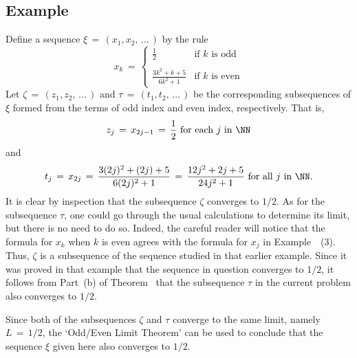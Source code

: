 \V

        \subsection{\small{{\bf Example}}}
        \label{ExampC20.95}

\V

        Define a sequence ${\xi} \,=\, (x_{1},x_{2},\,{\ldots}\,)$ by the rule
        \begin{displaymath}
        x_{k} \,=\, 
        \left\{
        \begin{array}{ll}
        {\displaystyle \frac{1}{2}} & \mbox{if $k$ is odd} \\
                                            &                      \\
        {\displaystyle \frac{3k^{2}+k+5}{6k^{2}+1}}  & \mbox{if $k$ is even}
        \end{array}
                \right.
        \end{displaymath}
    Let ${\zeta} \,=\, (z_{1},z_{2},\,{\ldots}\,)$ and ${\tau} \,=\, (t_{1},t_{2},\,{\ldots}\,)$ be the corresponding subsequences of ${\xi}$ formed from the terms of odd index and even index, respectively.
    That is,
        \begin{displaymath}
        z_{j} \,=\, x_{2j-1} \,=\, \frac{1}{2} \mbox{ for each $j$ in ${\NN}$}
        \end{displaymath}
    and
        \begin{displaymath}
        t_{j} \,=\, x_{2j} \,=\, \frac{3(2j)^{2}+(2j)+5}{6(2j)^{2}+1} \,=\, 
    \frac{12j^{2}+2j+5}{24j^{2}+1}
 \mbox{ for all $j$ in ${\NN}$}.
        \end{displaymath}
    It is clear by inspection that the subsequence ${\zeta}$ converges to $1/2$.
    As for the subsequence ${\tau}$, one could go through the usual calculations to  determine its limit, but there is no need to do so.
    Indeed, the careful reader will notice that the formula for $x_{k}$ when $k$ is even agrees with the formula for $x_{j}$ in Example~~(3).
    Thus, ${\zeta}$ is a subsequence of the sequence studied in that earlier example.
    Since it was proved in that example that the sequence in question converges to $1/2$, it follows from Part~(b) of Theorem~ that the subsequence ${\tau}$ in the current problem also converges to $1/2$.

        Since both of the subsequences ${\zeta}$ and ${\tau}$ converge to the same limit, namely $L \,=\, 1/2$,
    the `Odd/Even Limit Theorem' can be used to conclude that the sequence ${\xi}$ given here also converges to $1/2$.

